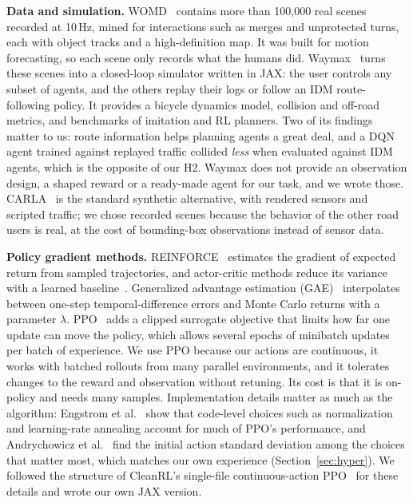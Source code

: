 \documentclass[conference]{IEEEtran}
\begin{document}
\textbf{Data and simulation.} WOMD~\cite{ettinger2021womd} contains more than 100,000
real scenes recorded at 10\,Hz, mined for interactions such as merges and unprotected
turns, each with object tracks and a high-definition map. It was built for motion
forecasting, so each scene only records what the humans did. Waymax~\cite{gulino2023waymax}
turns these scenes into a closed-loop simulator written in JAX: the user controls any
subset of agents, and the others replay their logs or follow an IDM route-following
policy. It provides a bicycle dynamics model, collision and off-road metrics, and
benchmarks of imitation and RL planners. Two of its findings matter to us: route
information helps planning agents a great deal, and a DQN agent trained against replayed
traffic collided \emph{less} when evaluated against IDM agents, which is the opposite of
our H2. Waymax does not provide an observation design, a shaped reward or a ready-made
agent for our task, and we wrote those. CARLA~\cite{dosovitskiy2017carla} is the standard
synthetic alternative, with rendered sensors and scripted traffic; we chose recorded
scenes because the behavior of the other road users is real, at the cost of
bounding-box observations instead of sensor data.

\textbf{Policy gradient methods.} REINFORCE~\cite{williams1992reinforce} estimates the
gradient of expected return from sampled trajectories, and actor-critic methods reduce
its variance with a learned baseline~\cite{sutton2018rl}. Generalized advantage estimation
(GAE)~\cite{schulman2016gae} interpolates between one-step temporal-difference errors and
Monte Carlo returns with a parameter $\lambda$. PPO~\cite{schulman2017ppo} adds a clipped
surrogate objective that limits how far one update can move the policy, which allows
several epochs of minibatch updates per batch of experience. We use PPO because our
actions are continuous, it works with batched rollouts from many parallel environments,
and it tolerates changes to the reward and observation without retuning. Its cost is
that it is on-policy and needs many samples. Implementation details matter as much as
the algorithm: Engstrom et al.~\cite{engstrom2020implementation} show that code-level
choices such as normalization and learning-rate annealing account for much of PPO's
performance, and Andrychowicz et al.~\cite{andrychowicz2021matters} find the initial
action standard deviation among the choices that matter most, which matches our own
experience (Section~\ref{sec:hyper}). We followed the structure of CleanRL's
single-file continuous-action PPO~\cite{huang2022cleanrl} for these details and wrote our
own JAX version.
\end{document}
